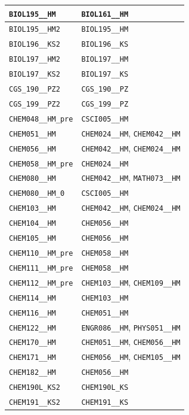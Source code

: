 \begin{longtable}{|p{4.4in}|p{4.4in}|}
    \verb|BIOL195__HM| & \verb|BIOL161__HM|\\\hline
    \verb|BIOL195__HM2| & \verb|BIOL195__HM|\\\hline
    \verb|BIOL196__KS2| & \verb|BIOL196__KS|\\\hline
    \verb|BIOL197__HM2| & \verb|BIOL197__HM|\\\hline
    \verb|BIOL197__KS2| & \verb|BIOL197__KS|\\\hline
    \verb|CGS_190__PZ2| & \verb|CGS_190__PZ|\\\hline
    \verb|CGS_199__PZ2| & \verb|CGS_199__PZ|\\\hline
    \verb|CHEM048__HM_pre| & \verb|CSCI005__HM|\\\hline
    \verb|CHEM051__HM| & \verb|CHEM024__HM|, \verb|CHEM042__HM|\\\hline
    \verb|CHEM056__HM| & \verb|CHEM042__HM|, \verb|CHEM024__HM|\\\hline
    \verb|CHEM058__HM_pre| & \verb|CHEM024__HM|\\\hline
    \verb|CHEM080__HM| & \verb|CHEM042__HM|, \verb|MATH073__HM|\\\hline
    \verb|CHEM080__HM_0| & \verb|CSCI005__HM|\\\hline
    \verb|CHEM103__HM| & \verb|CHEM042__HM|, \verb|CHEM024__HM|\\\hline
    \verb|CHEM104__HM| & \verb|CHEM056__HM|\\\hline
    \verb|CHEM105__HM| & \verb|CHEM056__HM|\\\hline
    \verb|CHEM110__HM_pre| & \verb|CHEM058__HM|\\\hline
    \verb|CHEM111__HM_pre| & \verb|CHEM058__HM|\\\hline
    \verb|CHEM112__HM_pre| & \verb|CHEM103__HM|, \verb|CHEM109__HM|\\\hline
    \verb|CHEM114__HM| & \verb|CHEM103__HM|\\\hline
    \verb|CHEM116__HM| & \verb|CHEM051__HM|\\\hline
    \verb|CHEM122__HM| & \verb|ENGR086__HM|, \verb|PHYS051__HM|\\\hline
    \verb|CHEM170__HM| & \verb|CHEM051__HM|, \verb|CHEM056__HM|\\\hline
    \verb|CHEM171__HM| & \verb|CHEM056__HM|, \verb|CHEM105__HM|\\\hline
    \verb|CHEM182__HM| & \verb|CHEM056__HM|\\\hline
    \verb|CHEM190L_KS2| & \verb|CHEM190L_KS|\\\hline
    \verb|CHEM191__KS2| & \verb|CHEM191__KS|\\\hline

\end{longtable}
